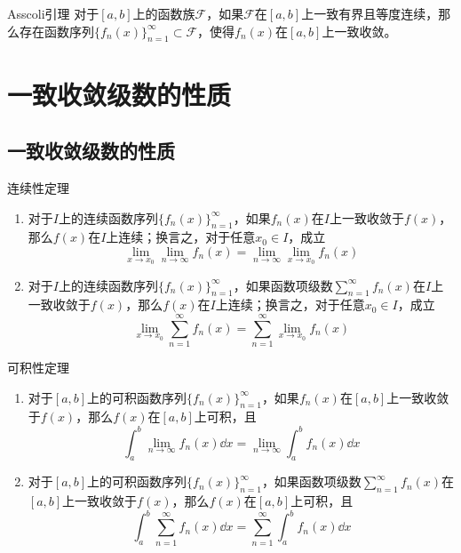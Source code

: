 \documentclass[lang = cn, scheme = chinese, thmcnt = section]{elegantbook}
\newcommand{\sub}{\subset}             %
\newcommand{\dis}{\displaystyle}
\begin{document}
\begin{theorem}{Asscoli引理}
	对于$[a,b]$上的函数族$\mathscr{F}$，如果$\mathscr{F}$在$[a,b]$上一致有界且等度连续，那么存在函数序列$\{f_n(x)\}_{n=1}^{\infty}\sub\mathscr{F}$，使得$f_n(x)$在$[a,b]$上一致收敛。
\end{theorem}

\section{一致收敛级数的性质}

\subsection{一致收敛级数的性质}

\begin{theorem}{连续性定理}
	\begin{enumerate}
		\item 对于$I$上的连续函数序列$\{f_n(x)\}_{n=1}^{\infty}$，如果$f_n(x)$在$I$上一致收敛于$f(x)$，那么$f(x)$在$I$上连续；换言之，对于任意$x_0\in I$，成立
		$$
		\lim_{x\to x_0}\lim_{n\to\infty}f_n(x)
		=
		\lim_{n\to\infty}\lim_{x\to x_0}f_n(x)
		$$
		\item 对于$I$上的连续函数序列$\{f_n(x)\}_{n=1}^{\infty}$，如果函数项级数$\dis\sum_{n=1}^{\infty}f_n(x)$在$I$上一致收敛于$f(x)$，那么$f(x)$在$I$上连续；换言之，对于任意$x_0\in I$，成立
		$$
		\lim_{x\to x_0}\sum_{n=1}^{\infty}f_n(x)
		=
		\sum_{n=1}^{\infty}\lim_{x\to x_0}f_n(x)
		$$
	\end{enumerate}
\end{theorem}

\begin{theorem}{可积性定理}
	\begin{enumerate}
		\item 对于$[a,b]$上的可积函数序列$\{f_n(x)\}_{n=1}^{\infty}$，如果$f_n(x)$在$[a,b]$上一致收敛于$f(x)$，那么$f(x)$在$[a,b]$上可积，且
		$$
		\int_{a}^{b}\lim_{n\to\infty}f_n(x)\dd x
		=
		\lim_{n\to\infty}\int_{a}^{b}f_n(x)\dd x
		$$
		\item 对于$[a,b]$上的可积函数序列$\{f_n(x)\}_{n=1}^{\infty}$，如果函数项级数$\dis\sum_{n=1}^{\infty}f_n(x)$在$[a,b]$上一致收敛于$f(x)$，那么$f(x)$在$[a,b]$上可积，且
		$$
		\int_{a}^{b}\sum_{n=1}^{\infty}f_n(x)\dd x
		=
		\sum_{n=1}^{\infty}\int_{a}^{b}f_n(x)\dd x
		$$
	\end{enumerate}
\end{theorem}
\end{document}
